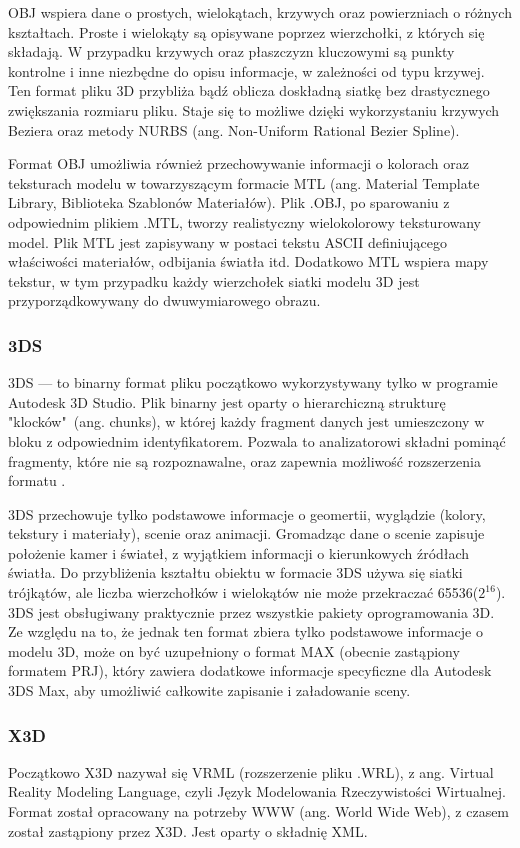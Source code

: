 OBJ wspiera dane o prostych, wielokątach, krzywych oraz powierzniach o różnych kształtach. Proste i wielokąty są opisywane poprzez wierzchołki, z których się składają. W przypadku krzywych oraz płaszczyzn kluczowymi są punkty kontrolne i inne niezbędne do opisu informacje, w zależności od typu krzywej. Ten format pliku 3D przybliża bądź oblicza doskładną siatkę bez drastycznego zwiększania rozmiaru pliku. Staje się to możliwe dzięki wykorzystaniu krzywych Beziera oraz metody NURBS (ang. Non-Uniform Rational Bezier Spline). 

Format OBJ umożliwia również przechowywanie informacji o kolorach oraz teksturach modelu w towarzyszącym formacie MTL (ang. Material Template Library, Biblioteka Szablonów Materiałów). Plik .OBJ, po sparowaniu z odpowiednim plikiem .MTL, tworzy realistyczny wielokolorowy teksturowany model. Plik MTL jest zapisywany w postaci tekstu ASCII definiującego właściwości materiałów, odbijania światła itd. Dodatkowo MTL wspiera mapy tekstur, w tym przypadku każdy wierzchołek siatki modelu 3D jest przyporządkowywany do dwuwymiarowego obrazu. 

\subsubsection{3DS}
3DS --- to binarny format pliku początkowo wykorzystywany tylko w programie Autodesk 3D Studio. Plik binarny jest oparty o hierarchiczną strukturę "klocków"\ (ang. chunks), w której każdy fragment danych jest umieszczony w bloku z odpowiednim identyfikatorem. Pozwala to analizatorowi składni pominąć fragmenty, które nie są rozpoznawalne, oraz zapewnia możliwość rozszerzenia formatu \cite{3dsformat}. 

3DS przechowuje tylko podstawowe informacje o geomertii, wyglądzie (kolory, tekstury i materiały), scenie oraz animacji. Gromadząc dane o scenie zapisuje położenie kamer i świateł, z wyjątkiem informacji o kierunkowych źródłach światła. Do przybliżenia kształtu obiektu w formacie 3DS używa się siatki trójkątów, ale liczba wierzchołków i wielokątów nie może przekraczać 65536($2^{16}$). 3DS jest obsługiwany praktycznie przez wszystkie pakiety oprogramowania 3D. Ze względu na to, że jednak ten format zbiera tylko podstawowe informacje o modelu 3D, może on być uzupełniony o format MAX (obecnie zastąpiony formatem PRJ), który zawiera dodatkowe informacje specyficzne dla Autodesk 3DS Max, aby umożliwić całkowite zapisanie i załadowanie sceny.

\subsubsection{X3D}
Początkowo X3D nazywał się VRML (rozszerzenie pliku .WRL), z ang. Virtual Reality Modeling Language, czyli Język Modelowania Rzeczywistości Wirtualnej. Format został opracowany na potrzeby WWW (ang. World Wide Web), z czasem został zastąpiony przez X3D. Jest oparty o składnię XML.

